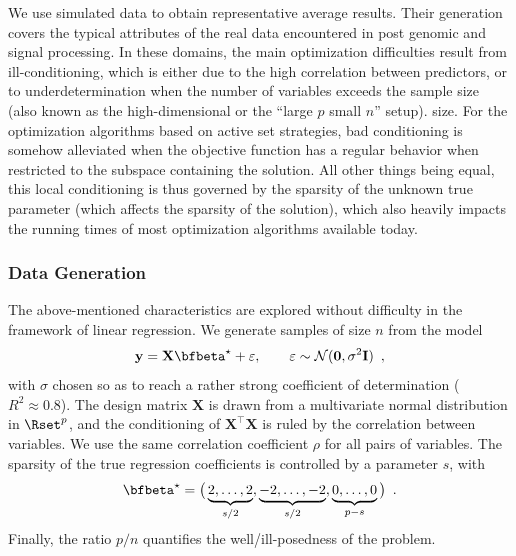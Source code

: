 We use simulated data to obtain representative average results. 
Their generation covers the typical attributes of the real data encountered in
post genomic and signal processing.
In these domains, the main optimization difficulties result from
ill-conditioning, which is either due to the high correlation between
predictors, or to underdetermination when the number of variables
exceeds the sample 
\iflong 
  size (also known as the high-dimensional or the ``large $p$ small $n$'' 
  setup).
\else
  size.
\fi
For the optimization algorithms based on active set strategies, bad
conditioning is somehow alleviated when the objective function has a regular
behavior when restricted to the subspace containing the solution.  All other
things being equal, this local conditioning is thus governed by the
sparsity of the unknown true parameter (which affects the sparsity of
the solution), which also heavily impacts the running times of most
optimization algorithms available today.

\subsubsection{Data Generation}

The above-mentioned characteristics are explored without difficulty in the
framework of linear regression. We generate samples of size $n$ from the model
\begin{equation*}
  \mathbf{y} = \mathbf{X} \bfbeta^\star + \varepsilon, \qquad
  \varepsilon \sim\mathcal{N}(\mathbf{0},\sigma^2\mathbf{I})
  \enspace,
\end{equation*}
with $\sigma$ chosen so as to reach a rather strong  coefficient of
determination ($R^2\approx 0.8$).  The design matrix $\mathbf{X}$ is drawn from
a multivariate normal distribution in $\Rset^p$, and the conditioning of
$\mathbf{X}^\intercal\mathbf{X}$ is ruled by the correlation between variables. 
We use the same correlation coefficient $\rho$ for all pairs of variables.
The sparsity of the true regression coefficients is controlled by a parameter
$s$, with
\begin{equation*}
  \bfbeta^\star = \big(\underbrace{2,\dots,2}_{s/2} , \underbrace{-2,\dots,-2}_{s/2} , \underbrace{0,\dots,0}_{p-s} \big)
  \enspace.
\end{equation*}
Finally, the ratio $p/n$
quantifies the well/ill-posedness of the problem.


